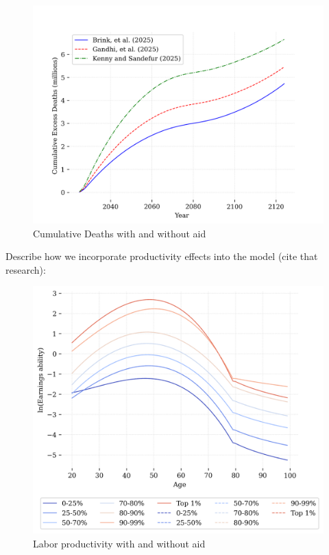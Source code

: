 \documentclass[letterpaper,12pt]{article}
\theoremstyle{definition}
\begin{document}
\begin{spacing}{1.5}
\begin{figure}[h]
    \caption{Cumulative Deaths with and without aid}
    \centering
    \includegraphics[scale=0.75]{./tables_figures/cumulative_excess_deaths.png}
\end{figure}

Describe how we incorporate productivity effects into the model (cite that research):

\begin{figure}[h]
    \caption{Labor productivity with and without aid}
    \centering
    \includegraphics[scale=0.75]{./tables_figures/ability_profiles.png}
\end{figure}


\end{spacing}
\end{document}
